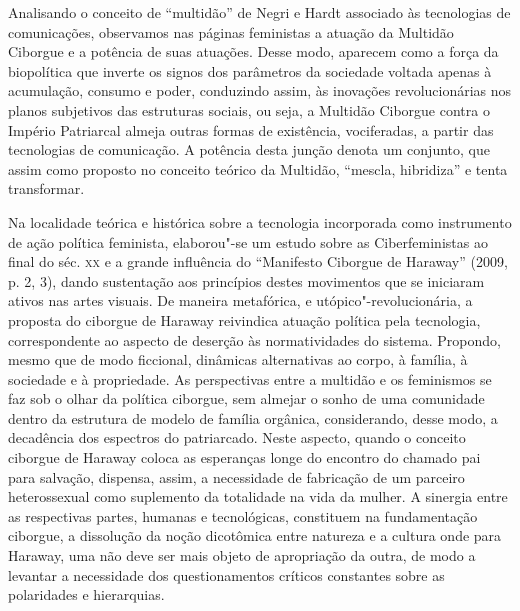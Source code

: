 Analisando o conceito de ``multidão'' de Negri e Hardt associado às
tecnologias de comunicações, observamos nas páginas feministas a atuação
da Multidão Ciborgue e a potência de suas atuações. Desse modo, aparecem
como a força da biopolítica que inverte os signos dos parâmetros da
sociedade voltada apenas à acumulação, consumo e poder, conduzindo
assim, às inovações revolucionárias nos planos subjetivos das estruturas
sociais, ou seja, a Multidão Ciborgue contra o Império Patriarcal almeja
outras formas de existência, vociferadas, a partir das tecnologias de
comunicação. A potência desta junção denota um conjunto, que assim como
proposto no conceito teórico da Multidão, ``mescla, hibridiza'' e tenta
transformar.

Na localidade teórica e histórica sobre a tecnologia incorporada como
instrumento de ação política feminista, elaborou"-se um estudo sobre as
Ciberfeministas ao final do séc. \textsc{xx} e a grande influência do ``Manifesto
Ciborgue de Haraway'' (2009, p. 2, 3), dando sustentação aos princípios
destes movimentos que se iniciaram ativos nas artes visuais. De maneira
metafórica, e utópico"-revolucionária, a proposta do ciborgue de Haraway
reivindica atuação política pela tecnologia, correspondente ao aspecto
de deserção às normatividades do sistema. Propondo, mesmo que de modo
ficcional, dinâmicas alternativas ao corpo, à família, à sociedade e à
propriedade. As perspectivas entre a multidão e os feminismos se faz sob
o olhar da política ciborgue, sem almejar o sonho de uma comunidade
dentro da estrutura de modelo de família orgânica, considerando, desse
modo, a decadência dos espectros do patriarcado. Neste aspecto, quando o
conceito ciborgue de Haraway coloca as esperanças longe do encontro do
chamado pai para salvação, dispensa, assim, a necessidade de fabricação
de um parceiro heterossexual como suplemento da totalidade na vida da
mulher. A sinergia entre as respectivas partes, humanas e tecnológicas,
constituem na fundamentação ciborgue, a dissolução da noção dicotômica
entre natureza e a cultura onde para Haraway, uma não deve ser mais
objeto de apropriação da outra, de modo a levantar a necessidade dos
questionamentos críticos constantes sobre as polaridades e hierarquias.

